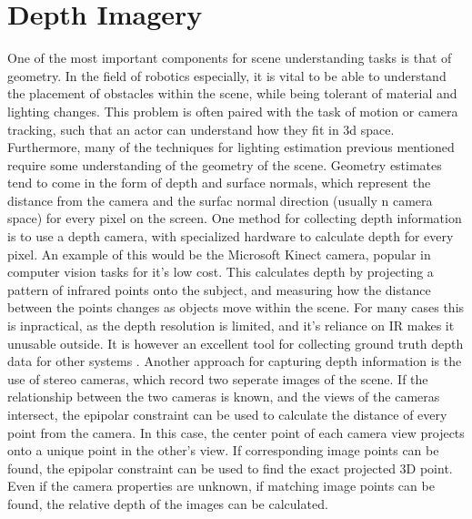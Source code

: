 \documentclass[ %
                    author={Gavin Parker},
                supervisor={Dr. Neill Campbell},
                    degree={MEng},
                     title={Deep Siamese Networks for Illumination Estimation from Stereo Images},
                  subtitle={},
                      type={research},
                      year={2018} ]{dissertation}
\begin{document}
\section{Depth Imagery}
One of the most important components for scene understanding tasks is that of geometry. In the field of robotics especially, it is vital to be able to understand the placement of obstacles within the scene, while being tolerant of material and lighting changes. This problem is often paired with the task of motion or camera tracking, such that an actor can understand how they fit in 3d space. Furthermore, many of the techniques for lighting estimation previous mentioned require some understanding of the geometry of the scene. Geometry estimates tend to come in the form of depth and surface normals, which represent the distance from the camera and the surfac normal direction (usually n camera space) for every pixel on the screen.
\newline
One method for collecting depth information is to use a depth camera, with specialized hardware to calculate depth for every pixel. An example of this would be the Microsoft Kinect camera, popular in computer vision tasks for it's low cost. This calculates depth by projecting a pattern of infrared points onto the subject, and measuring how the distance between the points changes as objects move within the scene. For many cases this is inpractical, as the depth resolution is limited, and it's reliance on IR makes it unusable outside. It is however an excellent tool for collecting ground truth depth data for other systems \cite{Khoshelham_accuracyand}.
\newline
Another approach for capturing depth information is the use of stereo cameras, which record two seperate images of the scene. If the relationship between the two cameras is known, and the views of the cameras intersect, the epipolar constraint can be used to calculate the distance of every point from the camera. In this case, the center point of each camera view projects onto a unique point in the other's view. If corresponding image points can be found, the epipolar constraint can be used to find the exact projected 3D point. Even if the camera properties are unknown, if matching image points can be found, the relative depth of the images can be calculated.
\newline
\end{document}
